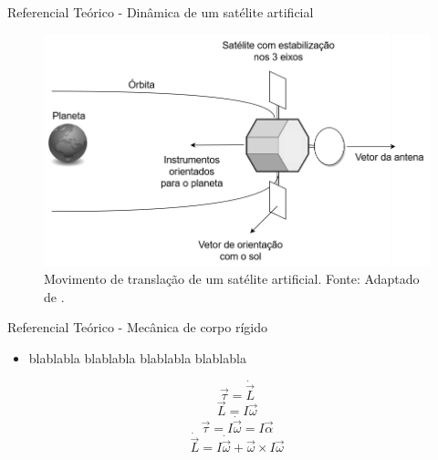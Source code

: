 \documentclass{beamer}
\begin{document}
\begin{frame}{Referencial Teórico - Dinâmica de um satélite artificial}
    \begin{figure}[HT]
		\begin{center}
		\captionsetup{justification=centering}
        \includegraphics[scale=.42]{../referencial/img/rotational_brown_p256}
        \caption{Movimento de translação de um satélite artificial. \newline
        		 Fonte: Adaptado de .}
		\label{FIG_ADAPTATIVO}
        \end{center}
	\end{figure}
\end{frame}


\begin{frame}{Referencial Teórico - Mecânica de corpo rígido}
	\begin{itemize}
		\justifying
		\item blablabla blablabla blablabla blablabla 
    \end{itemize}

    \begin{equation}
		\vec{\tau}=\dot{\vec{L}}
	\end{equation}
	\begin{equation}\label{eq:iomega}
		\vec{L}=I\vec{\omega}
	\end{equation}
	\begin{equation}\label{iomega}
		\vec{\tau}=I\dot{\vec{\omega}}=I\vec{\alpha}
	\end{equation}
	\begin{equation}
		\dot{\vec{L}}=I\dot{\vec{\omega}}+\vec{\omega}\times I \vec{\omega}
	\end{equation}

\end{frame}
\end{document}
